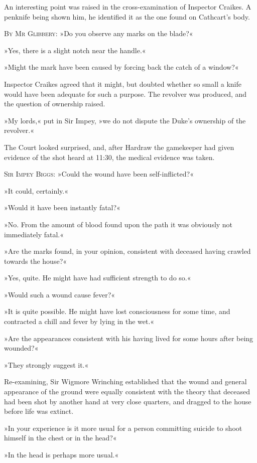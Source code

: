 An interesting point was raised in the cross-examination of Inspector Craikes. A penknife being shown him, he identified it as the one found on Cathcart's body.

\textsc{By Mr Glibbery}: »Do you observe any marks on the blade?«

»Yes, there is a slight notch near the handle.«

»Might the mark have been caused by forcing back the catch of a window?«

Inspector Craikes agreed that it might, but doubted whether so small a knife would have been adequate for such a purpose. The revolver was produced, and the question of ownership raised.

»My lords,« put in Sir Impey, »we do not dispute the Duke's ownership of the revolver.«

The Court looked surprised, and, after Hardraw the gamekeeper had given evidence of the shot heard at 11:30, the medical evidence was taken.

\textsc{Sir Impey Biggs}: »Could the wound have been self-inflicted?«

»It could, certainly.«

»Would it have been instantly fatal?«

»No. From the amount of blood found upon the path it was obviously not immediately fatal.«

»Are the marks found, in your opinion, consistent with deceased having crawled towards the house?«

»Yes, quite. He might have had sufficient strength to do so.«

»Would such a wound cause fever?«

»It is quite possible. He might have lost consciousness for some time, and contracted a chill and fever by lying in the wet.«

»Are the appearances consistent with his having lived for some hours after being wounded?«

»They strongly suggest it.«

Re-examining, Sir Wigmore Wrinching established that the wound and general appearance of the ground were equally consistent with the theory that deceased had been shot by another hand at very close quarters, and dragged to the house before life was extinct.

»In your experience is it more usual for a person committing suicide to shoot himself in the chest or in the head?«

»In the head is perhaps more usual.«

